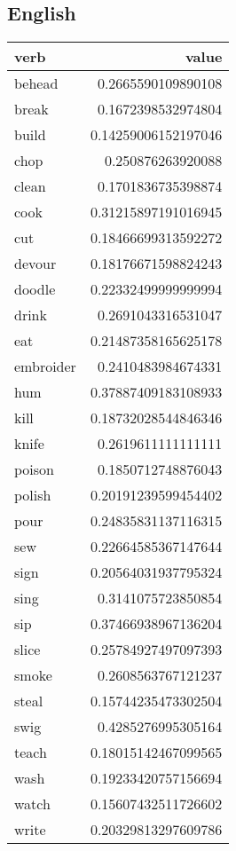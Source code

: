 \subsection{English}

\begin{longtable}{l|r}
\textbf{verb}     & \textbf{value}    \\
\hline
\endhead
behead    & 0.2665590109890108  \\
break     & 0.1672398532974804  \\
build     & 0.14259006152197046 \\
chop      & 0.250876263920088   \\
clean     & 0.1701836735398874  \\
cook      & 0.31215897191016945 \\
cut       & 0.18466699313592272 \\
devour    & 0.18176671598824243 \\
doodle    & 0.22332499999999994 \\
drink     & 0.2691043316531047  \\
eat       & 0.21487358165625178 \\
embroider & 0.2410483984674331  \\
hum       & 0.37887409183108933 \\
kill      & 0.18732028544846346 \\
knife     & 0.2619611111111111  \\
poison    & 0.1850712748876043  \\
polish    & 0.20191239599454402 \\
pour      & 0.24835831137116315 \\
sew       & 0.22664585367147644 \\
sign      & 0.20564031937795324 \\
sing      & 0.3141075723850854  \\
sip       & 0.37466938967136204 \\
slice     & 0.25784927497097393 \\
smoke     & 0.2608563767121237  \\
steal     & 0.15744235473302504 \\
swig      & 0.4285276995305164  \\
teach     & 0.18015142467099565 \\
wash      & 0.19233420757156694 \\
watch     & 0.15607432511726602 \\
write     & 0.20329813297609786
\end{longtable}


